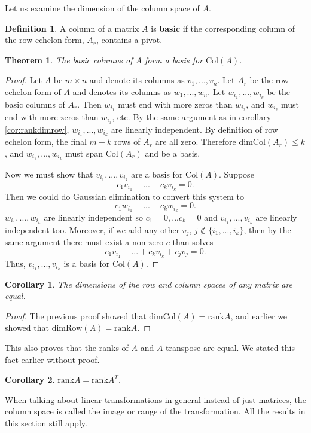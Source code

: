 \documentclass[12pt,reqno]{amsart}
\newtheorem{theorem}{Theorem}[section]
\newtheorem{corollary}{Corollary}[section]
\theoremstyle{definition}
\newtheorem{definition}{Definition}[section]
\newcommand{\rank}{\mathrm{rank}}
\newcommand{\row}{\mathrm{Row}}
\newcommand{\col}{\mathrm{Col}}
\renewcommand{\dim}{\mathrm{dim}}
\begin{document}
Let us examine the dimension of the column space of $A$.
\begin{definition}
  A column of a matrix $A$ is \textbf{basic} if the corresponding
  column of the row echelon form, $A_r$, contains a pivot.
\end{definition}
\begin{theorem}
  The basic columns of $A$ form a basis for $\col(A)$. 
\end{theorem}
\begin{proof}
  Let $A$ be $m \times n$ and denote its columns as $v_1,...,v_n$. Let
  $A_r$ be the row echelon form of $A$ and denotes its columns as
  $w_1,...,w_n$. Let $w_{i_1}, ..., w_{i_k}$ be the basic columns of
  $A_r$. Then $w_{i_1}$ must end with more zeros than $w_{i_2}$, and
  $w_{i_2}$ must end with more zeros than $w_{i_3}$, etc. By the same
  argument as in corollary \ref{cor:rankdimrow}, $w_{i_1},...,w_{i_k}$
  are linearly independent. By definition of row echelon form, the
  final $m-k$ rows of $A_r$ are all zero. Therefore $\dim \col(A_r) \leq
  k$, and $w_{i_1},...,w_{i_k}$ must span $\col(A_r)$ and be a basis. 

  Now we must show that $v_{i_1}, ..., v_{i_k}$ are a basis for
  $\col(A)$. Suppose
  \[ c_1 v_{i_1} + ... + c_k v_{i_k} = 0. \]
  Then we could do Gaussian elimination to convert this system to
  \[ c_1 w_{i_1} + ... + c_k w_{i_k} = 0. \]
  $w_{i_1},... , w_{i_k}$ are linearly independent so $c_1 = 0
  ,... c_k = 0$ and $v_{i_1}, ..., v_{i_k}$ are linearly independent
  too. Moreover, if we add any other $v_j$, $j \not\in \{i_1, ..., i_k\}$,
  then by the same argument there must exist a non-zero $c$ than
  solves 
  \[ c_1 v_{i_1} + ... + c_k v_{i_k} + c_j v_j = 0. \]
  Thus, $v_{i_1} , ..., v_{i_k}$ is a basis for $\col(A)$. 
\end{proof}
\begin{corollary}
  The dimensions of the row and column spaces of any matrix are
  equal. 
\end{corollary}
\begin{proof}
  The previous proof showed that $\dim \col(A) = \rank A$, and earlier
  we showed that $\dim \row(A) = \rank A$. 
\end{proof}
This also proves that the ranks of $A$ and $A$ transpose are equal. We
stated this fact earlier without proof.
\begin{corollary}
  $\rank A = \rank A^T$.
\end{corollary}
When talking about linear transformations in general instead of just
matrices, the column space is called the image or range of the
transformation. All the results in this section still apply. 
\end{document}
